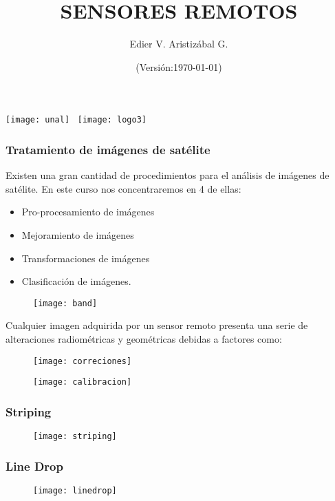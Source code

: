 \documentclass[14pt]{beamer}
\title[Tratamiento de Imágenes]{SENSORES REMOTOS}
\author[Edier Aristizábal]{Edier V. Aristizábal G.}
\institute{\emph{evaristizabalg@unal.edu.co}}
\date{\tiny{(Versión:\today)}}
\begin{document}
\begin{frame}
\titlepage
\centering
	\texttt{[image: unal]}\hspace*{4.75cm}~%
   	\texttt{[image: logo3]}
\end{frame}
\begin{frame}
\frametitle{Tratamiento de imágenes de satélite}
\scriptsize{Existen una gran cantidad de procedimientos para el análisis de imágenes de satélite. En este curso nos concentraremos en 4 de ellas:}
\begin{itemize}
\item Pro-procesamiento de imágenes
\item Mejoramiento de imágenes
\item Transformaciones de imágenes
\item Clasificación de imágenes.
\end{itemize}
  \begin{figure}
    \centering
    \texttt{[image: band]}
  \end{figure}
\end{frame}
\begin{frame}
\small{Cualquier imagen adquirida por un sensor remoto presenta una serie de alteraciones radiométricas y geométricas debidas a factores como:}
  \begin{figure}
    \centering
    \texttt{[image: correciones]}
  \end{figure}
\end{frame}
\begin{frame}
\scriptsize{}
  \begin{figure}
    \centering
    \texttt{[image: calibracion]}
  \end{figure}
\end{frame}
\begin{frame}
\frametitle{Striping}
\scriptsize{}
  \begin{figure}
    \centering
    \texttt{[image: striping]}
  \end{figure}
\end{frame}
\begin{frame}
\frametitle{Line Drop}
\scriptsize{}
  \begin{figure}
    \centering
    \texttt{[image: linedrop]}
  \end{figure}
\end{frame}
\end{document}
